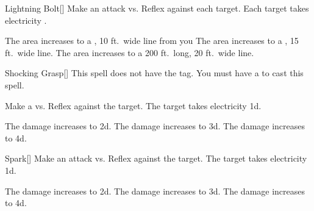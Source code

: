 \lowercase{\hypertarget{spell:Lightning Bolt}{}}\label{spell:Lightning Bolt}
\begin{freeability}[Rank 1]{\hypertarget{spell:Lightning Bolt}{Lightning Bolt}}[]
Make an attack vs. Reflex against each target.
\hit Each target takes electricity .

\rankline
{} The area increases to a \areahuge, 10 ft.\ wide line from you
 The area increases to a \areaext, 15 ft.\ wide line.
 The area increases to a 200 ft.\ long, 20 ft.\ wide line.
\end{freeability}
\vspace{0.25em}



\lowercase{\hypertarget{spell:Shocking Grasp}{}}\label{spell:Shocking Grasp}
\begin{freeability}[Rank 1]{\hypertarget{spell:Shocking Grasp}{Shocking Grasp}}[]
This spell does not have the  tag.
You must have a  to cast this spell.

Make a  vs. Reflex against the target.
\hit The target takes electricity  \plus1d.

\rankline
{} The damage increases to  \plus2d.
 The damage increases to  \plus3d.
 The damage increases to  \plus4d.
\end{freeability}
\vspace{0.25em}



\lowercase{\hypertarget{spell:Spark}{}}\label{spell:Spark}
\begin{freeability}[Rank 1]{\hypertarget{spell:Spark}{Spark}}[]
Make an attack vs. Reflex against the target.
\hit The target takes electricity  \plus1d.

\rankline
{} The damage increases to  \plus2d.
 The damage increases to  \plus3d.
 The damage increases to  \plus4d.
\end{freeability}
\vspace{0.25em}



